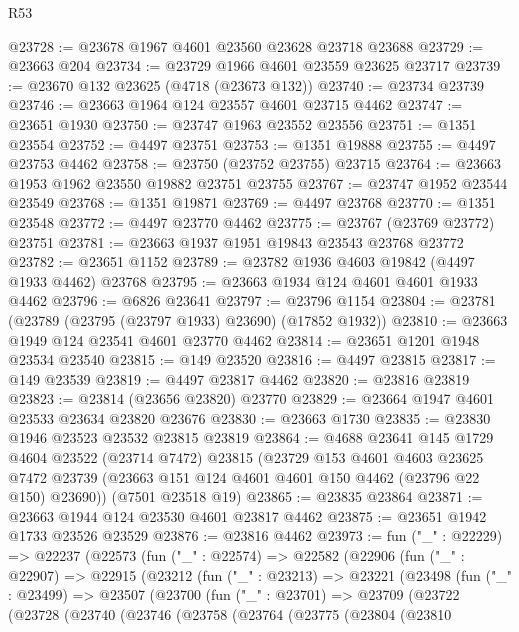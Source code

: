 \begin{lexlean}{R53}
\begin{coremodule}
@23728 := @23678 @1967 @4601 @23560 @23628 @23718 @23688
@23729 := @23663 @204
@23734 := @23729 @1966 @4601 @23559 @23625 @23717
@23739 := @23670 @132 @23625 (@4718 (@23673 @132))
@23740 := @23734 @23739
@23746 := @23663 @1964 @124 @23557 @4601 @23715 @4462
@23747 := @23651 @1930
@23750 := @23747 @1963 @23552 @23556
@23751 := @1351 @23554
@23752 := @4497 @23751
@23753 := @1351 @19888
@23755 := @4497 @23753 @4462
@23758 := @23750 (@23752 @23755) @23715
@23764 := @23663 @1953 @1962 @23550 @19882 @23751 @23755
@23767 := @23747 @1952 @23544 @23549
@23768 := @1351 @19871
@23769 := @4497 @23768
@23770 := @1351 @23548
@23772 := @4497 @23770 @4462
@23775 := @23767 (@23769 @23772) @23751
@23781 := @23663 @1937 @1951 @19843 @23543 @23768 @23772
@23782 := @23651 @1152
@23789 := @23782 @1936 @4603 @19842 (@4497 @1933 @4462) @23768
@23795 := @23663 @1934 @124 @4601 @4601 @1933 @4462
@23796 := @6826 @23641
@23797 := @23796 @1154
@23804 := @23781 (@23789 (@23795 (@23797 @1933) @23690) (@17852 @1932))
@23810 := @23663 @1949 @124 @23541 @4601 @23770 @4462
@23814 := @23651 @1201 @1948 @23534 @23540
@23815 := @149 @23520
@23816 := @4497 @23815
@23817 := @149 @23539
@23819 := @4497 @23817 @4462
@23820 := @23816 @23819
@23823 := @23814 (@23656 @23820) @23770
@23829 := @23664 @1947 @4601 @23533 @23634 @23820 @23676
@23830 := @23663 @1730
@23835 := @23830 @1946 @23523 @23532 @23815 @23819
@23864 := @4688
    @23641
    @145
    @1729
    @4604
    @23522
    (@23714 @7472)
    @23815
    (@23729
      @153
      @4601
      @4603
      @23625
      @7472
      @23739
      (@23663 @151 @124 @4601 @4601 @150 @4462 (@23796 @22 @150) @23690))
    (@7501 @23518 @19)
@23865 := @23835 @23864
@23871 := @23663 @1944 @124 @23530 @4601 @23817 @4462
@23875 := @23651 @1942 @1733 @23526 @23529
@23876 := @23816 @4462
@23973 := fun ("_" : @22229) =>
  @22237
    (@22573
      (fun ("_" : @22574) =>
      @22582
        (@22906
          (fun ("_" : @22907) =>
          @22915
            (@23212
              (fun ("_" : @23213) =>
              @23221
                (@23498
                  (fun ("_" : @23499) =>
                  @23507
                    (@23700
                      (fun ("_" : @23701) =>
                      @23709
                        (@23722
                          (@23728
                            (@23740
                              (@23746
                                (@23758
                                  (@23764
                                    (@23775
                                      (@23804
                                        (@23810

\end{coremodule}
\end{lexlean}
